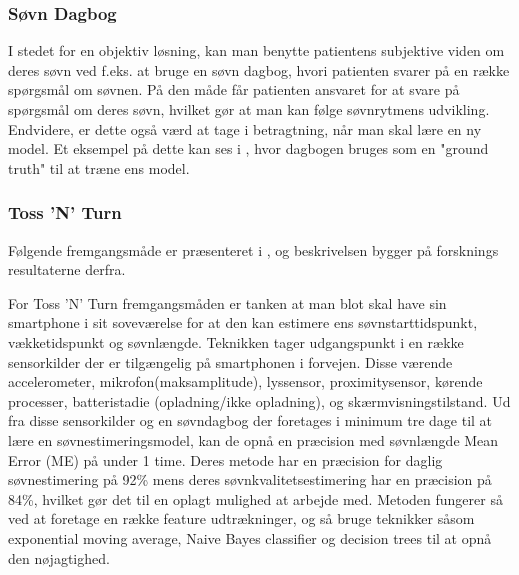 \subsubsection{Søvn Dagbog}
I stedet for en objektiv løsning, kan man benytte patientens subjektive viden om deres søvn ved f.eks. at bruge en søvn dagbog, hvori patienten svarer på en række spørgsmål om søvnen. 
På den måde får patienten ansvaret for at svare på spørgsmål om deres søvn, hvilket gør at man kan følge søvnrytmens udvikling.
Endvidere, er dette også værd at tage i betragtning, når man skal lære en ny model. 
Et eksempel på dette kan ses i \citet{Min:2014:TNT:2556288.2557220}, hvor dagbogen bruges som en "ground truth" til at træne ens model.
\begin{comment}
Med ressourcerne for dette projekt er dette dog ikke valgt som primær fokus, da vi ønsker en metode der kan estimere søvn med mindst mulig bruger intervention, og hvor grundlaget for vurdering skal være ved hjælp af sensorer fremfor en subjektiv vurdering man alligevel har mulighed for i forvejen.
Idéen om en "objektiv dagbog" er dermed også i tankerne her, og er hvorfor denne løsning ikke undersøges nærmere end at det kan bruges for læringsperioder for vores modeller.
\end{comment}

\subsubsection{Toss 'N' Turn}\label{sec:tossNturn}
Følgende fremgangsmåde er præsenteret i \citet{Min:2014:TNT:2556288.2557220}, og beskrivelsen bygger på forsknings resultaterne derfra.

For Toss 'N' Turn fremgangsmåden er tanken at man blot skal have sin smartphone i sit soveværelse for at den kan estimere ens søvnstarttidspunkt, vækketidspunkt og søvnlængde.
Teknikken tager udgangspunkt i en række sensorkilder der er tilgængelig på smartphonen i forvejen.
Disse værende accelerometer, mikrofon(maksamplitude), lyssensor, proximitysensor, kørende processer, batteristadie (opladning/ikke opladning), og skærmvisningstilstand.
Ud fra disse sensorkilder og en søvndagbog der foretages i minimum tre dage til at lære en søvnestimeringsmodel, kan de opnå en præcision med søvnlængde Mean Error (ME) på under 1 time.
Deres metode har en præcision for daglig søvnestimering på 92\% mens deres søvnkvalitetsestimering har en præcision på 84\%, hvilket gør det til en oplagt mulighed at arbejde med.
Metoden fungerer så ved at foretage en række feature udtrækninger, og så bruge teknikker såsom exponential moving average, Naive Bayes classifier og decision trees til at opnå den nøjagtighed.

